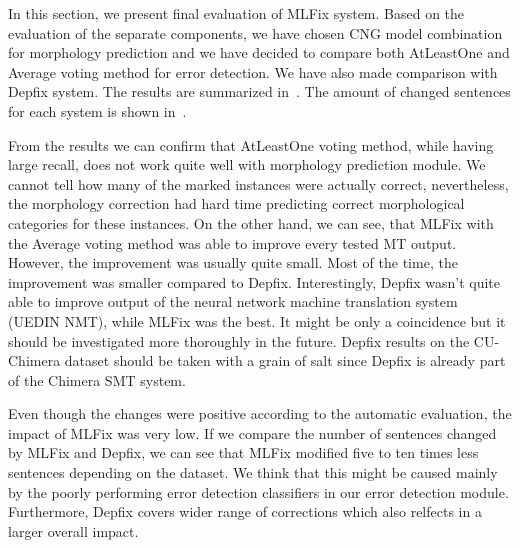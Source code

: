 In this section, we present final evaluation of MLFix system. Based on the evaluation of the
separate components, we have chosen CNG model combination for morphology prediction and we
have decided to compare both AtLeastOne and Average voting method for error detection. We
have also made comparison with Depfix system. The results are summarized in~.
The amount of changed sentences for each system is shown in~.

From the results we can confirm that AtLeastOne voting method, while having large recall, does not work
quite well with morphology prediction module. We cannot tell how many of the marked instances were actually
correct, nevertheless, the morphology correction had hard time predicting correct morphological categories
for these instances. On the other hand, we can see, that MLFix with the Average voting method
was able to improve every tested MT output. However, the improvement was
usually quite small. Most of the time, the improvement was smaller compared to Depfix. Interestingly,
Depfix wasn't quite able to improve output of the neural network machine translation system (UEDIN NMT),
while MLFix was the best. It might be only a coincidence but it should be investigated more thoroughly
in the future. Depfix results on the CU-Chimera dataset should be taken with a grain of salt since
Depfix is already part of the Chimera SMT system.

Even though the changes were positive according to the automatic evaluation, the impact of MLFix was
very low. If we compare the number of sentences changed by MLFix and Depfix, we can see that MLFix
modified five to ten times less sentences depending on the dataset. We think that this might be
caused mainly by the poorly performing error detection classifiers in our error detection module.
Furthermore, Depfix covers wider range of corrections which also relfects in a larger overall impact.

